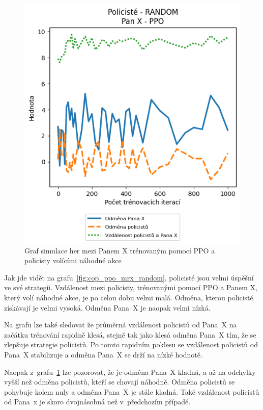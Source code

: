 \begin{figure}[H]
\begin{minipage}{.48\textwidth}
    \includegraphics[width=1\textwidth]{obrazky-figures/graphs/cop_RANDOM_mrx_PPO}
      \caption{Graf simulace her mezi Panem X trénovaným pomocí PPO a policisty volícími náhodné akce}
      \label{fig:cop_random_mrx_ppo}
  \end{minipage}
  \end{figure}

Jak jde vidět na grafu~\ref{fig:cop_ppo_mrx_random}, policisté jsou velmi úspěšní ve své strategii.
Vzdálenost mezi policisty, trénovanými pomocí PPO a Panem X, který volí náhodné akce, je po celou dobu velmi malá.
Odměna, kterou policisté získávají je velmi vysoká.
Odměna Pana~X je naopak velmi nízká.

Na grafu lze také sledovat že průměrná vzdálenost policistů od Pana~X na začátku trénování rapidně klesá, stejně tak jako klesá odměna Pana~X tím, že se zlepšuje strategie policistů.
Po tomto rapidním poklesu se vzdálenost policistů od Pana~X stabilizuje a odměna Pana~X se drží na nízké hodnotě.

Naopak z~grafu~\ref{fig:cop_random_mrx_ppo} lze pozorovat, že je odměna Pana~X kladná, a až na odchylky vyšší než odměna policistů, kteří se chovají náhodně.
Odměna policistů se pohybuje kolem nuly a odměna Pana~X je stále kladná.
Také vzdálenost policistů od Pana~x je skoro dvojnásobná než v~předchozím případě.

